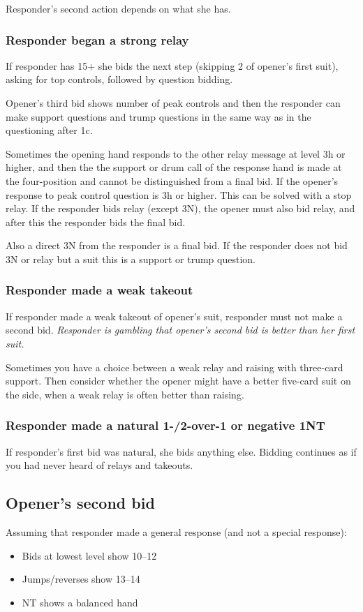 \documentclass[a4paper, twoside, 11pt]{article}
\begin{document}
\begin{multicols}{3}
Responder's second action depends on what she has.

\subsubsection*{Responder began a strong relay}
If responder has 15+ she bids the next step (skipping 2 of opener's first suit), asking for top controls,
followed by question bidding.

Opener's third bid shows number of peak controls and then the responder can make support questions and trump questions in the same way as in the questioning after 1c.

Sometimes the opening hand responds to the other
relay message at level 3h or higher, and then the
the support or drum call of the response hand is made at the four-position
and cannot be distinguished from a final bid.
If the opener's response to
peak control question is 3h or higher.
This can
be solved with a stop relay.
If the responder bids relay
(except 3N), the opener must also bid relay,
and after this the responder bids the final bid.

Also
a direct 3N from the responder is a final bid. If
the responder does not bid 3N or relay but a suit
this is a support or trump question.

\subsubsection*{Responder made a weak takeout}
If responder made a weak takeout of opener's suit, responder must not make a second bid. \textit{Responder is gambling that opener's second bid is better than her first suit.}

Sometimes you have a choice between a weak relay and
raising with three-card support. Then
consider whether the opener might have a better
five-card suit on the side, when a weak
relay is often better than raising.

\subsubsection*{Responder made a natural 1-/2-over-1 or negative 1NT}
If responder's first bid was natural, she bids anything else. Bidding continues as if you had never heard of relays and takeouts.


\subsection*{Opener's second bid}
Assuming that responder made a general response (and not a special response):
\begin{itemize}
    \item Bids at lowest level show 10--12
    \item Jumps/reverses show 13--14
    \item NT shows a balanced hand
\end{itemize}


\end{multicols}
\end{document}
